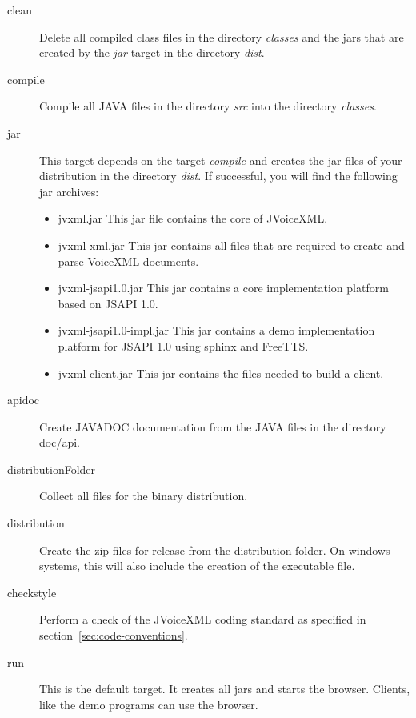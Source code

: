 \documentclass[11pt,a4paper]{article}
\begin{document}
\begin{description}
\item[clean]
Delete all compiled class files in the directory \emph{classes}
and the jars that are created by the \emph{jar} target in the directory 
\emph{dist}.

\item[compile]
 Compile all JAVA files in the directory \emph{src} into the directory
\emph{classes}.

\item[jar]
 This target depends on the target \emph{compile} and creates the jar
files of your distribution in the directory \emph{dist}.
If successful, you will find the following jar archives:
\begin{itemize}
\item jvxml.jar This jar file contains the core of JVoiceXML.
\item jvxml-xml.jar This jar contains all files that are required
to create and parse VoiceXML documents.
\item jvxml-jsapi1.0.jar This jar contains a core implementation platform
based on JSAPI 1.0.
\item jvxml-jsapi1.0-impl.jar This jar contains a demo implementation
platform for JSAPI 1.0 using sphinx and FreeTTS.
\item jvxml-client.jar This jar contains the files needed to build
a client.
\end{itemize}

\item[apidoc]
Create JAVADOC documentation from the JAVA files in the directory
doc/api.

\item[distributionFolder]
Collect all files for the binary distribution.

\item[distribution]
Create the zip files for release from the distribution folder.
On windows systems, this will also include the creation of
the executable file.

\item[checkstyle]
Perform a check of the JVoiceXML coding standard as specified 
in section~\ref{sec:code-conventions}.

\item[run]
This is the default target. It creates all jars and starts the browser. 
Clients, like the demo programs can use the browser.


\end{description}
\end{document}
